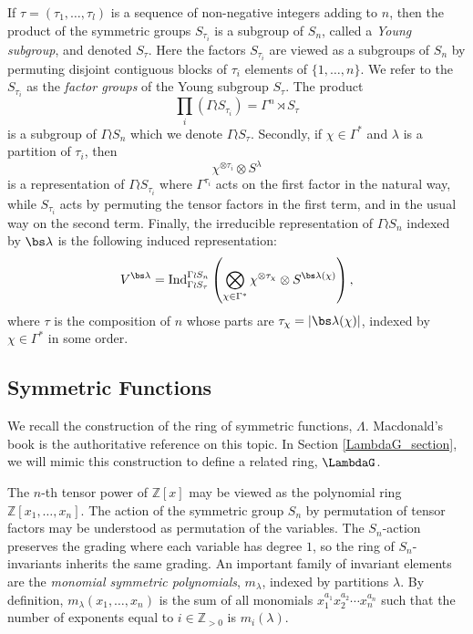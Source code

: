 If $\tau = (\tau_1, \ldots, \tau_l)$ is a sequence of non-negative integers adding to $n$, then the product of the symmetric groups $S_{\tau_i}$ is a subgroup of $S_n$, called a \emph{Young subgroup}, and denoted $S_\tau$. Here the factors $S_{\tau_i}$ are viewed as a subgroups of $S_n$ by permuting disjoint contiguous blocks of $\tau_i$ elements of $\{1,\ldots, n\}$. We refer to the $S_{\tau_i}$ as the \emph{factor groups} of the Young subgroup $S_\tau$. The product
\[
\prod_{i} (\Gamma \wr S_{\tau_i}) = \Gamma^n \rtimes S_\tau
\]
is a subgroup of $\Gamma \wr S_n$ which we denote $\Gamma \wr S_\tau$. Secondly, if $\chi \in \Gamma^*$ and $\lambda$ is a partition of $\tau_i$, then 
\[
\chi^{\otimes \tau_i} \otimes S^{\lambda}
\]
is a representation of $\Gamma \wr S_{\tau_i}$ where $\Gamma^{\tau_i}$ acts on the first factor in the natural way, while $S_{\tau_i}$ acts by permuting the tensor factors in the first term, and in the usual way on the second term. Finally, the irreducible representation of $\Gamma \wr S_n$ indexed by $\bs\lambda$ is the following induced representation:
\[
V^{\bs\lambda} =
\mathrm{Ind}_{\Gamma \wr S_{\tau}}^{\Gamma \wr S_n} \left( \bigotimes_{\chi \in \Gamma^*} \chi^{\otimes \tau_\chi} \otimes S^{\bs\lambda(\chi)}
\right),
\]
where $\tau$ is the composition of $n$ whose parts are $\tau_\chi = |\bs\lambda(\chi)|$, indexed by $\chi \in \Gamma^*$ in some order.


\subsection{Symmetric Functions} 

We recall the construction of the ring of symmetric functions, $\Lambda$. Macdonald's book \cite{Macdonald} is the authoritative reference on this topic. In Section \ref{LambdaG_section}, we will mimic this construction to define a related ring, $\LambdaG$.

The $n$-th tensor power of $\mathbb{Z}[x]$ may be viewed as the polynomial ring $\mathbb{Z}[x_1, \ldots, x_n]$. The action of the symmetric group $S_n$ by permutation of tensor factors may be understood as permutation of the variables. The $S_n$-action preserves the grading where each variable has degree $1$, so the ring of $S_n$-invariants inherits the same grading. An important family of invariant elements are the \emph{monomial symmetric polynomials}, $m_\lambda$, indexed by partitions $\lambda$. By definition, $m_\lambda(x_1, \ldots, x_n)$ is the sum of all monomials $x_1^{a_1} x_2^{a_2} \cdots x_n^{a_n}$ such that the number of exponents equal to $i \in \mathbb{Z}_{>0}$ is $m_i(\lambda)$.


